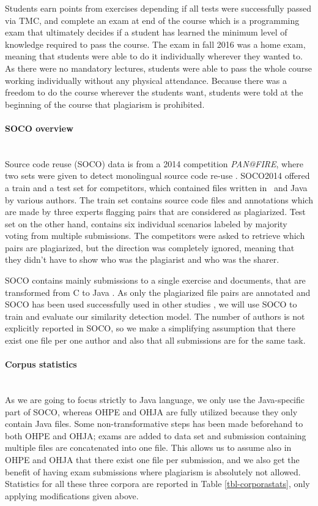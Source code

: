 Students earn points from exercises depending if all tests were successfully passed via TMC, and complete an exam at end of the course which is a programming exam that ultimately decides if a student has learned the minimum level of knowledge required to pass the course. The exam in fall 2016 was a home exam, meaning that students were able to do it individually wherever they wanted to. As there were no mandatory lectures, students were able to pass the whole course working individually without any physical attendance. Because there was a freedom to do the course wherever the students want, students were told at the beginning of the course that plagiarism is prohibited.

\paragraph{SOCO overview}\mbox{}\\
Source code reuse (SOCO) data is from a 2014 competition \emph{PAN@FIRE}, where two sets were given to detect monolingual source code re-use \cite{saez2014pan}. SOCO2014 offered a train and a test set for competitors, which contained files written in \cpp\, and Java by various authors. The train set contains source code files and annotations which are made by three experts flagging pairs that are considered as plagiarized. Test set on the other hand, contains six individual scenarios labeled by majority voting from multiple submissions. The competitors were asked to retrieve which pairs are plagiarized, but the direction was completely ignored, meaning that they didn't have to show who was the plagiarist and who was the sharer.  

SOCO contains mainly submissions to a single exercise and documents, that are transformed from C to Java \cite{saez2014pan}. As only the plagiarized file pairs are annotated and SOCO has been used successfully used in other studies \cite{AIR2015, RCISCP2017, OTIOLSS2015, USCR2014}, we
will use SOCO to train and evaluate our similarity detection model. The number of authors is not explicitly reported in SOCO, so we make a simplifying assumption that there exist one file per one author and also that all submissions are for the same task. 



\paragraph{Corpus statistics}\mbox{}\\
As we are going to focus strictly to Java language, we only use the Java-specific part of SOCO, whereas OHPE and OHJA are fully utilized because they only contain Java files. Some non-transformative steps has been made beforehand to both OHPE and OHJA; exams are added to data set and submission containing multiple files are concatenated into one file. This allows us to assume also in OHPE and OHJA that there exist one file per submission, and we also get the benefit of having exam submissions where plagiarism is absolutely not allowed. Statistics for all these three corpora are reported in Table \ref{tbl-corporastats}, only applying modifications given above.




